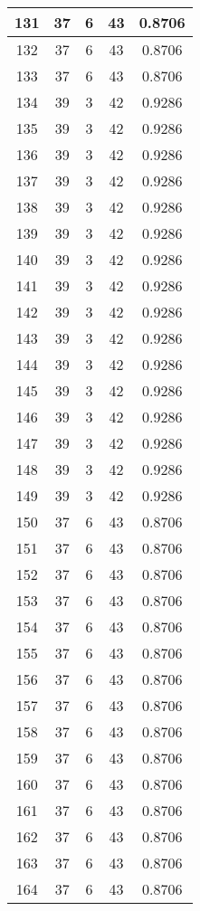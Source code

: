 \documentclass[letterpaper, 12pt]{article}
\begin{document}
\begin{longtable}{|c|c|c|c|c|}
\hline
131 & 37 & 6 & 43 & 0.8706 \\
\hline
132 & 37 & 6 & 43 & 0.8706 \\
\hline
133 & 37 & 6 & 43 & 0.8706 \\
\hline
134 & 39 & 3 & 42 & 0.9286 \\
\hline
135 & 39 & 3 & 42 & 0.9286 \\
\hline
136 & 39 & 3 & 42 & 0.9286 \\
\hline
137 & 39 & 3 & 42 & 0.9286 \\
\hline
138 & 39 & 3 & 42 & 0.9286 \\
\hline
139 & 39 & 3 & 42 & 0.9286 \\
\hline
140 & 39 & 3 & 42 & 0.9286 \\
\hline
141 & 39 & 3 & 42 & 0.9286 \\
\hline
142 & 39 & 3 & 42 & 0.9286 \\
\hline
143 & 39 & 3 & 42 & 0.9286 \\
\hline
144 & 39 & 3 & 42 & 0.9286 \\
\hline
145 & 39 & 3 & 42 & 0.9286 \\
\hline
146 & 39 & 3 & 42 & 0.9286 \\
\hline
147 & 39 & 3 & 42 & 0.9286 \\
\hline
148 & 39 & 3 & 42 & 0.9286 \\
\hline
149 & 39 & 3 & 42 & 0.9286 \\
\hline
150 & 37 & 6 & 43 & 0.8706 \\
\hline
151 & 37 & 6 & 43 & 0.8706 \\
\hline
152 & 37 & 6 & 43 & 0.8706 \\
\hline
153 & 37 & 6 & 43 & 0.8706 \\
\hline
154 & 37 & 6 & 43 & 0.8706 \\
\hline
155 & 37 & 6 & 43 & 0.8706 \\
\hline
156 & 37 & 6 & 43 & 0.8706 \\
\hline
157 & 37 & 6 & 43 & 0.8706 \\
\hline
158 & 37 & 6 & 43 & 0.8706 \\
\hline
159 & 37 & 6 & 43 & 0.8706 \\
\hline
160 & 37 & 6 & 43 & 0.8706 \\
\hline
161 & 37 & 6 & 43 & 0.8706 \\
\hline
162 & 37 & 6 & 43 & 0.8706 \\
\hline
163 & 37 & 6 & 43 & 0.8706 \\
\hline
164 & 37 & 6 & 43 & 0.8706 \\

\end{longtable}
\end{document}
